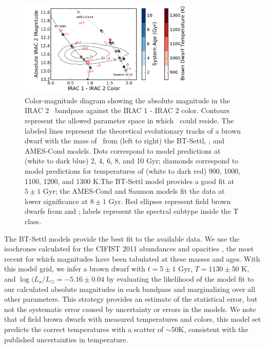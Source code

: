\begin{figure}[htbp!]
\centerline{\includegraphics[width=0.75\textwidth]{chapter5/f3.pdf}}
\caption[Color-magnitude diagram showing the absolute magnitude in the IRAC 2 \irb\ bandpass
against the IRAC 1 - IRAC 2 color]{Color-magnitude diagram showing the absolute magnitude in the IRAC 2 \irb\ bandpass
against the IRAC 1 - IRAC 2 color. Contours represent the allowed parameter space in which \LC\ could 
reside. The labeled lines represent the theoretical evolutionary tracks of a brown dwarf with the mass of 
\LC\ from (left to right) the BT-Settl, \citet{Saumon12}, and AMES-Cond models. Dots correspond to model predictions
at (white to dark blue) 2, 4, 6, 8, and 10 Gyr; diamonds correspond to model predictions for temperatures of
(white to dark red) 900, 1000, 1100, 1200, and 1300 K.The BT-Settl model provides a good fit at $5 \pm 1$ Gyr; the 
AMES-Cond and Saumon models fit the data at lower significance at $8 \pm 1$ Gyr. 
Red ellipses represent field brown dwarfs from \citet{Dupuy12} and \citet{Filippazzo15}; labels represent the spectral subtype inside the T class.  }
\label{fig:CMD}
\end{figure}

The BT-Settl models provide the best fit to the available data. We use the isochrones
calculated for the CIFIST 2011 abundances and opacities \citep{Caffau10, Allard12}, the most recent for which 
magnitudes have been tabulated at these masses and ages.
With this model grid, we infer a brown dwarf with $t = 5 \pm 1$ Gyr, $T = 1130 \pm 50$ K,
and $\log(L_\star /L_\odot = -5.16  \pm   0.04$ by evaluating the likelihood of the model fit to our calculated absolute magnitudes
in each bandpass and marginalizing over all other parameters. 
This strategy provides an estimate of the statistical error, but not the systematic error caused by uncertainty
or errors in the models.
We note that of field brown dwarfs with measured temperatures
and colors, this model set predicts the correct temperatures with a scatter of $\sim 50$K, consistent with 
the published uncertainties in temperature.

